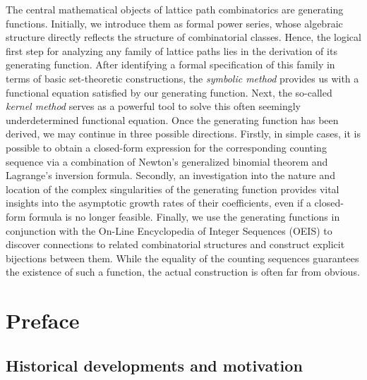 The central mathematical objects of lattice path combinatorics are generating functions.
Initially, we introduce them as formal power series, whose algebraic structure directly reflects the structure of combinatorial classes.
Hence, the logical first step for analyzing any family of lattice paths lies in the derivation of its generating function. 
After identifying a formal specification of this family in terms of basic set-theoretic constructions, the \textit{symbolic method} provides us with a functional equation satisfied by our generating function.
Next, the so-called \textit{kernel method} serves as a powerful tool to solve this often seemingly underdetermined functional equation. 
Once the generating function has been derived, we may continue in three possible directions.
Firstly, in simple cases, it is possible to obtain a closed-form expression for the corresponding counting sequence via a combination of Newton's generalized binomial theorem and Lagrange's inversion formula.
Secondly, an investigation into the nature and location of the complex singularities of the generating function provides vital insights into the asymptotic growth rates of their coefficients, even if a closed-form formula is no longer feasible.
Finally, we use the generating functions in conjunction with the On-Line Encyclopedia of Integer Sequences (OEIS) to discover connections to related combinatorial structures and construct explicit bijections between them. 
While the equality of the counting sequences guarantees the existence of such a function, the actual construction is often far from obvious.

\cleardoublepage

\chapter*{Preface}
\thispagestyle{empty}

\section*{Historical developments and motivation}

